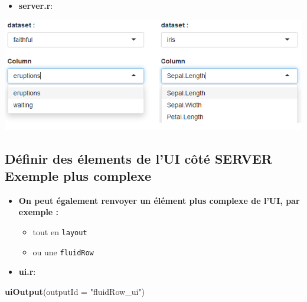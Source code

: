 \documentclass[]{article}
\newenvironment{Shaded}{\begin{snugshade}}{\end{snugshade}}
\newcommand{\KeywordTok}[1]{\textcolor[rgb]{0.13,0.29,0.53}{\textbf{#1}}}
\newcommand{\DataTypeTok}[1]{\textcolor[rgb]{0.13,0.29,0.53}{#1}}
\newcommand{\StringTok}[1]{\textcolor[rgb]{0.31,0.60,0.02}{#1}}
\newcommand{\OperatorTok}[1]{\textcolor[rgb]{0.81,0.36,0.00}{\textbf{#1}}}
\newcommand{\NormalTok}[1]{#1}
\providecommand{\tightlist}{%
  \setlength{\itemsep}{0pt}\setlength{\parskip}{0pt}}
\begin{document}
\begin{itemize}
\tightlist
\item
  \textbf{server.r}:
\end{itemize}

\begin{Shaded}
\end{Shaded}

\includegraphics{img/ui_output.png}

\subsection{Définir des élements de l'UI côté SERVER \textbar{} Exemple
plus
complexe}\label{definir-des-elements-de-lui-cote-server-exemple-plus-complexe}

\begin{itemize}
\tightlist
\item
  \textbf{On peut également renvoyer un élément plus complexe de l'UI,
  par exemple :}

  \begin{itemize}
  \tightlist
  \item
    tout en \texttt{layout}
  \item
    ou une \texttt{fluidRow}
  \end{itemize}
\item
  \textbf{ui.r}:
\end{itemize}

\begin{Shaded}
\begin{Highlighting}[]
\KeywordTok{uiOutput}\NormalTok{(}\DataTypeTok{outputId =} \StringTok{"fluidRow_ui"}\NormalTok{)}
\end{Highlighting}
\end{Shaded}
\end{document}
